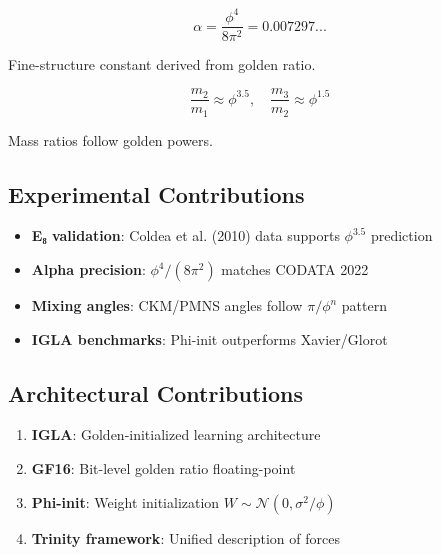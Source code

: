 \begin{theorem}
\label{thm:alpha-summary}
\begin{equation}
\alpha = \frac{\phi^4}{8\pi^2} = 0.007297...
\end{equation}

Fine-structure constant derived from golden ratio.
\end{theorem}

\begin{theorem}
\label{thm:e8-summary}
\begin{equation}
\frac{m_2}{m_1} \approx \phi^{3.5}, \quad \frac{m_3}{m_2} \approx \phi^{1.5}
\end{equation}

Mass ratios follow golden powers.
\end{theorem}

\subsection{Experimental Contributions}

\begin{itemize}
    \item \textbf{E₈ validation}: Coldea et al. (2010) data supports $\phi^{3.5}$ prediction
    \item \textbf{Alpha precision}: $\phi^4/(8\pi^2)$ matches CODATA 2022
    \item \textbf{Mixing angles}: CKM/PMNS angles follow $\pi/\phi^n$ pattern
    \item \textbf{IGLA benchmarks}: Phi-init outperforms Xavier/Glorot
\end{itemize}

\subsection{Architectural Contributions}

\begin{enumerate}
    \item \textbf{IGLA}: Golden-initialized learning architecture
    \item \textbf{GF16}: Bit-level golden ratio floating-point
    \item \textbf{Phi-init}: Weight initialization $W \sim \mathcal{N}(0, \sigma^2/\phi)$
    \item \textbf{Trinity framework}: Unified description of forces
\end{enumerate}


